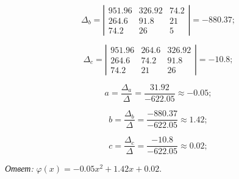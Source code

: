 \documentclass[a4paper, 12pt]{article}
\begin{document}
\begin{enumerate}
{    $$
    \Delta_b =
    \left |
      \begin{array}{ccc}
        951.96 & 326.92 & 74.2 \\
        264.6 & 91.8 & 21 \\
        74.2 & 26 & 5
      \end{array}
    \right |
    = -880.37;
    $$

    $$
    \Delta_c =
    \left |
      \begin{array}{ccc}
        951.96 & 264.6 & 326.92 \\
        264.6 & 74.2 & 91.8 \\
        74.2 & 21 & 26
      \end{array}
    \right |
    = -10.8;
    $$

    $$
    a = \dfrac {\Delta_a} {\Delta} = \dfrac {31.92} {-622.05} \approx -0.05;
    $$

    $$
    b = \dfrac {\Delta_b} {\Delta} = \dfrac {-880.37} {-622.05} \approx 1.42;
    $$

    $$
    c = \dfrac {\Delta_c} {\Delta} = \dfrac {-10.8} {-622.05} \approx 0.02;
    $$

    \emph{Ответ:} $\varphi (x) = -0.05x^2+1.42x+0.02$.


    
  }
\end{enumerate}
\end{document}
